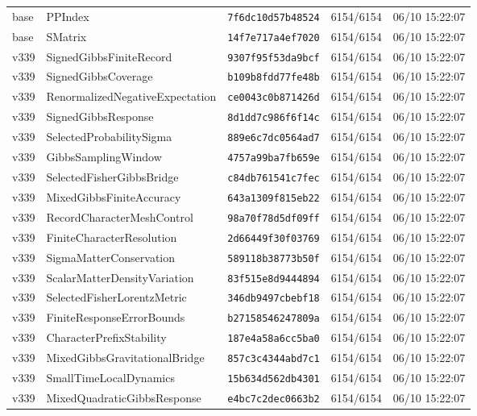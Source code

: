 \documentclass[11pt]{article}
\theoremstyle{definition}\newtheorem{deriv}{Derivation}
\begin{document}
{\begin{longtable}{@{}lllll@{}}
base & PPIndex & \texttt{7f6dc10d57b48524} & 6154/6154 & 06/10 15:22:07 \\
base & SMatrix & \texttt{14f7e717a4ef7020} & 6154/6154 & 06/10 15:22:07 \\
v339 & SignedGibbsFiniteRecord & \texttt{9307f95f53da9bcf} & 6154/6154 & 06/10 15:22:07 \\
v339 & SignedGibbsCoverage & \texttt{b109b8fdd77fe48b} & 6154/6154 & 06/10 15:22:07 \\
v339 & RenormalizedNegativeExpectation & \texttt{ce0043c0b871426d} & 6154/6154 & 06/10 15:22:07 \\
v339 & SignedGibbsResponse & \texttt{8d1dd7c986f6f14c} & 6154/6154 & 06/10 15:22:07 \\
v339 & SelectedProbabilitySigma & \texttt{889e6c7dc0564ad7} & 6154/6154 & 06/10 15:22:07 \\
v339 & GibbsSamplingWindow & \texttt{4757a99ba7fb659e} & 6154/6154 & 06/10 15:22:07 \\
v339 & SelectedFisherGibbsBridge & \texttt{c84db761541c7fec} & 6154/6154 & 06/10 15:22:07 \\
v339 & MixedGibbsFiniteAccuracy & \texttt{643a1309f815eb22} & 6154/6154 & 06/10 15:22:07 \\
v339 & RecordCharacterMeshControl & \texttt{98a70f78d5df09ff} & 6154/6154 & 06/10 15:22:07 \\
v339 & FiniteCharacterResolution & \texttt{2d66449f30f03769} & 6154/6154 & 06/10 15:22:07 \\
v339 & SigmaMatterConservation & \texttt{589118b38773b50f} & 6154/6154 & 06/10 15:22:07 \\
v339 & ScalarMatterDensityVariation & \texttt{83f515e8d9444894} & 6154/6154 & 06/10 15:22:07 \\
v339 & SelectedFisherLorentzMetric & \texttt{346db9497cbebf18} & 6154/6154 & 06/10 15:22:07 \\
v339 & FiniteResponseErrorBounds & \texttt{b27158546247809a} & 6154/6154 & 06/10 15:22:07 \\
v339 & CharacterPrefixStability & \texttt{187e4a58a6cc5ba0} & 6154/6154 & 06/10 15:22:07 \\
v339 & MixedGibbsGravitationalBridge & \texttt{857c3c4344abd7c1} & 6154/6154 & 06/10 15:22:07 \\
v339 & SmallTimeLocalDynamics & \texttt{15b634d562db4301} & 6154/6154 & 06/10 15:22:07 \\
v339 & MixedQuadraticGibbsResponse & \texttt{e4bc7c2dec0663b2} & 6154/6154 & 06/10 15:22:07 \\

\end{longtable}}
\end{document}
